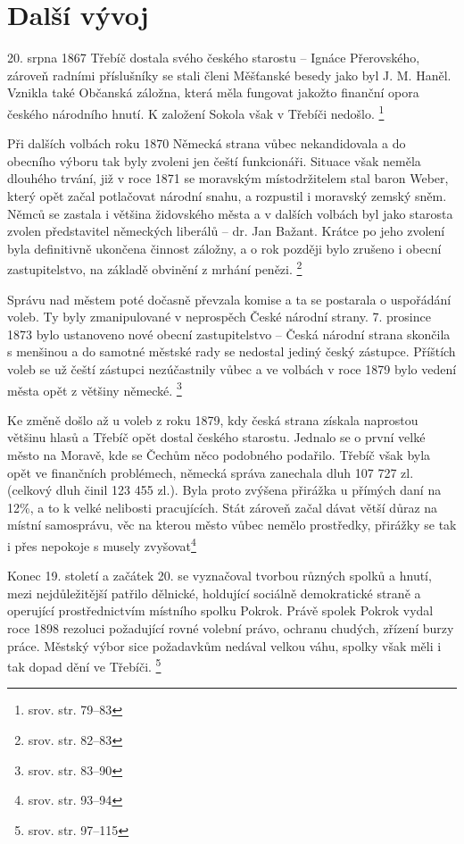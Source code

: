 \documentclass[a4paper,oneside,12pt]{report}
\begin{document}
\section{Další vývoj}

20. srpna 1867 Třebíč dostala svého českého starostu -- Ignáce Přerovského, zároveň radními příslušníky se stali členi Měšťanské besedy jako byl J. M. Haněl.
Vznikla také Občanská záložna, která měla fungovat jakožto finanční opora českého národního hnutí.
K založení Sokola však v Třebíči nedošlo. \footnote{srov. \cite{Janak1981} str. 79--83}

Při dalších volbách roku 1870 Německá strana vůbec nekandidovala a do obecního výboru tak byly zvoleni jen čeští funkcionáři.
Situace však neměla dlouhého trvání, již v roce 1871 se moravským místodržitelem stal baron Weber, který opět začal potlačovat národní snahu, a rozpustil i moravský zemský sněm.
Němců se zastala i většina židovského města a v dalších volbách byl jako starosta zvolen představitel německých liberálů -- dr. Jan Bažant.
Krátce po jeho zvolení byla definitivně ukončena činnost záložny, a o rok později bylo zrušeno i obecní zastupitelstvo, na základě obvinění z mrhání penězi. \footnote{srov. \cite{Janak1981} str. 82--83}

Správu nad městem poté dočasně převzala komise a ta se postarala o uspořádání voleb.
Ty byly zmanipulované v neprospěch České národní strany.
7. prosince 1873 bylo ustanoveno nové obecní zastupitelstvo -- Česká národní strana skončila s menšinou a do samotné městské rady se nedostal jediný český zástupce.
Příštích voleb se už čeští zástupci nezúčastnily vůbec a ve volbách v roce 1879 bylo vedení města opět z většiny německé. \footnote{srov. \cite{Janak1981} str. 83--90}

Ke změně došlo až u voleb z roku 1879, kdy česká strana získala naprostou většinu hlasů a Třebíč opět dostal českého starostu.
Jednalo se o první velké město na Moravě, kde se Čechům něco podobného podařilo.
Třebíč však byla opět ve finančních problémech, německá správa zanechala dluh 107 727 zl. (celkový dluh činil 123 455 zl.).
Byla proto zvýšena přirážka u přímých daní na 12\%, a to k velké nelibosti pracujících.
Stát zároveň začal dávat větší důraz na místní samosprávu, věc na kterou město vůbec nemělo prostředky, přirážky se tak i přes nepokoje s musely zvyšovat\footnote{srov. \cite{Janak1981} str. 93--94}

Konec 19. století a začátek 20. se vyznačoval tvorbou různých spolků a hnutí, mezi nejdůležitější patřilo dělnické, holdující sociálně demokratické straně a operující prostřednictvím místního spolku Pokrok.
Právě spolek Pokrok vydal roce 1898 rezoluci požadující rovné volební právo, ochranu chudých, zřízení burzy práce.
Městský výbor sice požadavkům nedával velkou váhu, spolky však měli i tak dopad dění ve Třebíči. \footnote{srov. \cite{Janak1981} str. 97--115}
\end{document}
